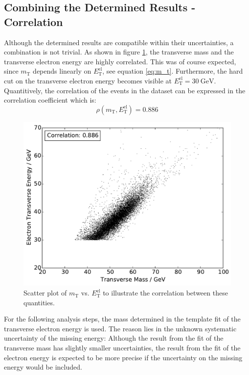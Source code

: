 \documentclass[
	paper=A4,
	parskip=full,
	chapterprefix=true,
	12pt,
	headings=normal,
	bibliography=totoc,
	listof=totoc,
	titlepage=on,
]{scrreprt}
\newcommand{\ELET}{\ensuremath{{E_\mathrm{T}^\mathrm{el}}}\xspace}
\newcommand{\MT}{\ensuremath{{m_\mathrm{T}}}\xspace}
\begin{document}
\subsection{Combining the Determined Results - Correlation}
Although the determined results are compatible within their uncertainties, a combination is not trivial. As shown in figure \ref{fig:corr}, the transverse mass and the transverse electron energy are highly correlated. This was of course expected, since \MT depends linearly on \ELET, see equation \ref{eq:m_t}. Furthermore, the hard cut on the transverse electron energy becomes visible at $\ELET=\SI{30}{\giga\electronvolt}$. Quantitively, the correlation of the events in the dataset can be expressed in the correlation coefficient which is:
\begin{equation}
\rho (\MT,\ELET)=0.886
\end{equation}
\begin{figure}
	\centering
	\includegraphics{correlation}
	\caption{Scatter plot of \MT vs. \ELET to illustrate the correlation between these quantities.}
	\label{fig:corr}
\end{figure}
For the following analysis steps, the \PW mass determined in the template fit of the transverse electron energy is used. The reason lies in the unknown systematic uncertainty of the missing energy: Although the result from the fit of the transverse mass has slightly smaller uncertainties, the result from the fit of the electron energy is expected to be more precise if the uncertainty on the missing energy would be included. 
\end{document}
